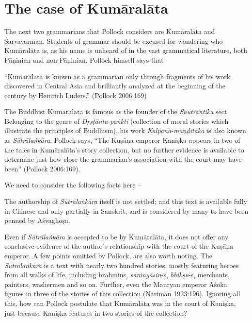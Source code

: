 \section{The case of Kumāralāta}\label{chap3-sec10}

The next two grammarians that Pollock considers are Kumāralāta and Śarvavarman. Students of grammar should be excused for wondering who Kumāralāta is, as his name is unheard of in the vast grammatical literature, both Pāṇinian and non-Pāṇinian. Pollock himself says that 
\begin{myquote}
``Kumāralāta is known as a grammarian only through fragments of his work discovered in Central Asia and brilliantly analyzed at the beginning of the century by Heinrich Lüders.''
\hfill (Pollock 2006:169)
\end{myquote}

The Buddhist Kumāralāta is famous as the founder of the {\sl Sautrāntika} sect. Belonging to the genre of {\sl Dṛṣṭānta-paṅkti} (collection of moral stories which illustrate the principles of Buddhism), his work {\sl Kalpanā-maṇḍitaka} is also known as {\sl Sūtrālaṅkāra}. Pollock says, ``The Kuṣāṇa emperor Kaniṣka appears in two of the tales in Kumāralāta's story collection, but no further evidence is available to determine just how close the grammarian's association with the court may have been'' (Pollock 2006:169).

We need to consider the following facts here --

The authorship of {\sl Sūtrālaṅkāra} itself is not settled; and this text is available fully in Chinese and only partially in Sanskrit, and is considered by many to have been penned by Aśvaghoṣa.

Even if {\sl Sūtrālaṅkāra} is accepted to be by Kumāralāta, it does not offer any conclusive evidence of the author's relationship with the court of the Kuṣāṇa emperor. A few points omitted by Pollock, are also worth noting. The {\sl Sūtrālaṅkāra} is a text with nearly two hundred stories, mostly featuring heroes from all walks of life, including brahmins, {\sl saṁnyāsin}-s, {\sl bhikṣu}-s, merchants, painters, washermen and so on. Further, even the Mauryan emperor Aśoka figures in three of the stories of this collection (Nariman 1923:196). Ignoring all this, how can Pollock postulate that Kumāralāta was in the court of Kaniṣka, just because Kaniṣka features in two stories of the collection?

